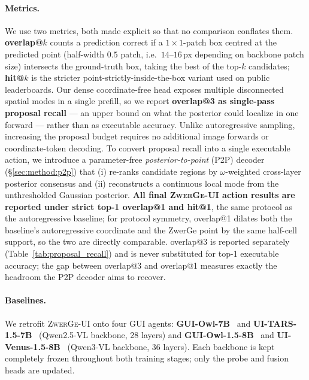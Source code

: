 \paragraph{Metrics.}
We use two metrics, both made explicit so that no comparison conflates them.
\textbf{overlap@$k$} counts a prediction correct if a $1{\times}1$-patch box centred at the predicted point (half-width $0.5$ patch, i.e.\ $14$--$16$\,px depending on backbone patch size) intersects the ground-truth box, taking the best of the top-$k$ candidates; \textbf{hit@$k$} is the stricter point-strictly-inside-the-box variant used on public leaderboards.
Our dense coordinate-free head exposes multiple disconnected spatial modes in a single prefill, so we report \textbf{overlap@3 as single-pass proposal recall} --- an upper bound on what the posterior could localize in one forward --- rather than as executable accuracy. Unlike autoregressive sampling, increasing the proposal budget requires no additional image forwards or coordinate-token decoding.
To convert proposal recall into a single executable action, we introduce a parameter-free \emph{posterior-to-point} (P2P) decoder (\S\ref{sec:method:p2p}) that (i) re-ranks candidate regions by $\omega$-weighted cross-layer posterior consensus and (ii) reconstructs a continuous local mode from the unthresholded Gaussian posterior.
\textbf{All final \textsc{ZwerGe-UI} action results are reported under strict top-1 overlap@1 and hit@1}, the same protocol as the autoregressive baseline; for protocol symmetry, overlap@1 dilates both the baseline's autoregressive coordinate and the ZwerGe point by the same half-cell support, so the two are directly comparable.
overlap@3 is reported separately (Table~\ref{tab:proposal_recall}) and is never substituted for top-1 executable accuracy; the gap between overlap@3 and overlap@1 measures exactly the headroom the P2P decoder aims to recover.

\paragraph{Baselines.}
We retrofit \textsc{ZwerGe-UI} onto four GUI agents: \textbf{GUI-Owl-7B}~\citep{ye2025guiowl} and \textbf{UI-TARS-1.5-7B}~\citep{qin2025uitars} (Qwen2.5-VL backbone, 28 layers) and \textbf{GUI-Owl-1.5-8B}~\citep{xu2026mobile} and \textbf{UI-Venus-1.5-8B}~\citep{team2026ui} (Qwen3-VL backbone, 36 layers). Each backbone is kept completely frozen throughout both training stages; only the probe and fusion heads are updated.

